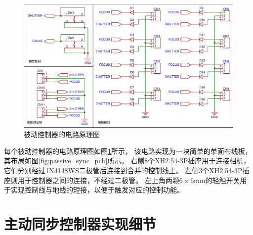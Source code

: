 \begin{figure}
    \includegraphics[width=\textwidth]{figures/passive_sync_schematic}
    \caption{被动控制器的电路原理图}
    \label{fig:passive_sync_schematic}
\end{figure}
每个被动控制器的电路原理图如图\ref{fig:passive_sync_schematic}所示，
该电路实现为一块简单的单面布线板，其布局如图\ref{fig:passive_sync_pcb}所示。
右侧8个XH2.54-3P插座用于连接相机，它们分别经过1N4148WS二极管后连接到合并的控制线上。
左侧3个XH2.54-3P插座则用于控制器之间的连接，不经过二极管。
左上角两颗$6\times 6$mm的轻触开关用于实现控制线与地线的短接，以便于触发对应的控制功能。


\chapter{主动同步控制器实现细节}
\label{app:active_sync}

